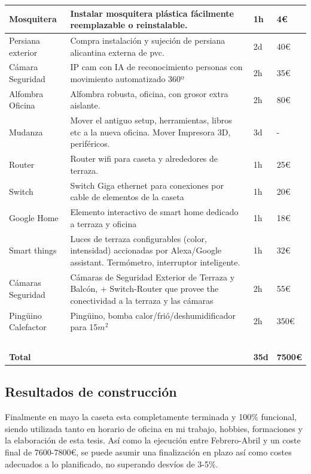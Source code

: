 \begin{center}
\begin{longtable}[ht]{|p{3cm}|p{8cm}|p{1.5cm}|p{1.5cm}|}
    Mosquitera  & Instalar mosquitera plástica fácilmente reemplazable o reinstalable. & 1h & 4€ \\ \hline
    Persiana exterior & Compra instalación y sujeción de persiana alicantina externa de pvc. & 2d & 40€ \\ \hline
    Cámara Seguridad & IP cam con IA de reconocimiento personas con movimiento automatizado 360º & 2h & 35€ \\ \hline
    Alfombra Oficina & Alfombra robusta, oficina, con grosor extra aislante. & 2h & 80€ \\ \hline
    Mudanza & Mover el antiguo setup, herramientas, libros etc a la nueva oficina. Mover Impresora 3D, periféricos. & 3d & - \\ \hline
    Router & Router wifi para caseta y alrededores de terraza. & 1h & 25€ \\ \hline
    Switch & Switch Giga ethernet para conexiones por cable de elementos de la caseta & 1h & 20€ \\ \hline
    Google Home & Elemento interactivo de smart home dedicado a terraza y oficina & 1h & 18€ \\ \hline
    Smart things & Luces de terraza configurables (color, intensidad) accionadas por Alexa/Google assistant. Termómetro, interruptor inteligente. & 1h & 32€ \\ \hline
    Cámaras Seguridad & Cámaras de Seguridad Exterior de Terraza y Balcón, + Switch-Router que provee the conectividad a la terraza y las cámaras & 2h & 55€ \\ \hline
    Pingüino Calefactor & Pingüino, bomba calor/frió/deshumidificador para 15$m^{2}$ & 2h & 350€ \\ \hline
    ~ & ~ & ~ & ~ \\ \hline
    \textbf{Total} & ~ & \textbf{35d} & \textbf{7500€} \\ \hline
\end{longtable}
\end{center}

\subsection{Resultados de construcción}

Finalmente en mayo la caseta esta completamente terminada y 100\% funcional, siendo utilizada tanto en horario de oficina en mi trabajo, hobbies, formaciones y la elaboración de esta tesis. Así como la ejecución entre Febrero-Abril y un coste final de 7600-7800€, se puede asumir una finalización en plazo así como costes adecuados a lo planificado, no superando desvíos de 3-5\%.

